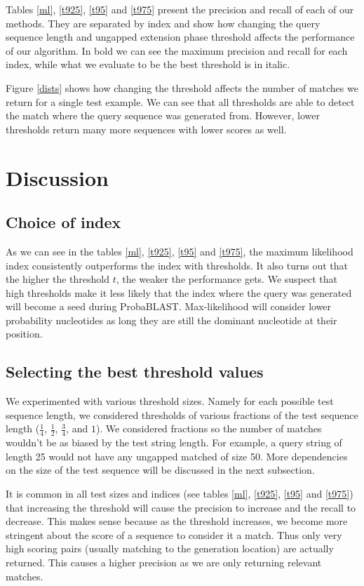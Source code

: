 \documentclass[11pt]{IEEEtran}
\begin{document}
Tables \ref{ml}, \ref{t925}, \ref{t95} and \ref{t975} present the precision and recall of each of our methods. They are separated by index and show how changing the query sequence length and ungapped extension phase threshold affects the performance of our algorithm. In bold we can see the maximum precision and recall for each index, while what we evaluate to be the best threshold is in italic.

Figure \ref{dists} shows how changing the threshold affects the number of matches we return for a single test example. We can see that all thresholds are able to detect the match where the query sequence was generated from. However, lower thresholds return many more sequences with lower scores as well.

\section{Discussion}

\subsection{Choice of index}

As we can see in the tables \ref{ml}, \ref{t925}, \ref{t95} and \ref{t975}, the maximum likelihood index consistently outperforms the index with thresholds. It also turns out that the higher the threshold $t$, the weaker the performance gets. We suspect that high thresholds make it less likely that the index where the query was generated will become a seed during ProbaBLAST. Max-likelihood will consider lower probability nucleotides as long they are still the dominant nucleotide at their position.

\subsection{Selecting the best threshold values}

We experimented with various threshold sizes. Namely for each possible test sequence length, we considered thresholds of various fractions of the test sequence length ($\frac{1}{4}$, $\frac{1}{2}$, $\frac{3}{4}$, and $1$). We considered fractions so the number of matches wouldn't be as biased by the test string length. For example, a query string of length 25 would not have any ungapped matched of size 50. More dependencies on the size of the test sequence will be discussed in the next subsection.

It is common in all test sizes and indices (see tables \ref{ml}, \ref{t925}, \ref{t95} and \ref{t975}) that increasing the threshold will cause the precision to increase and the recall to decrease. 
This makes sense because as the threshold increases, we become more stringent about the score of a sequence to consider it a match. Thus only very high scoring pairs (usually matching to the generation location) are actually returned. This causes a higher precision as we are only returning relevant matches.
\end{document}
